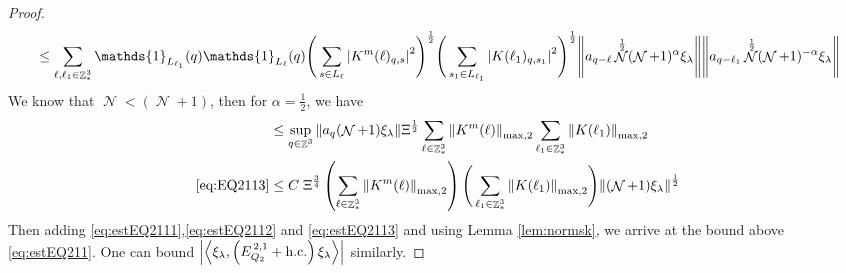 \documentclass[12pt,a4paper]{article}
\numberwithin{equation}{section}
\newcommand{\1}{\mathbb{I}}
\DeclareMathOperator{\Z}{\mathbb{Z}}
\DeclareMathOperator{\NN}{\mathcal{N}}
\newcommand{\half}{\frac{1}{2}}
\newcommand{\eva}[1]{\left\langle #1 \right\rangle}
\theoremstyle{plain}
\theoremstyle{definition}
\theoremstyle{remark}
\theoremstyle{plain}
\theoremstyle{definition}
\theoremstyle{remark}
\begin{document}
\begin{proof}
\begin{align}
	&\leq\sum\limits_{\ell, \ell_1\in \Z^3_*} \mathds{1}_{L_{\ell_1}}(q) \mathds{1}_{L_{\ell}}(q) \Bigg(\sum\limits_{s \in L_{\ell}} \abs{K^m(\ell)_{q,s}}^2\Bigg)^\half \Bigg(\sum\limits_{s_1 \in L_{\ell_1}} \abs{K(\ell_1)_{q,s_1}}^2\Bigg)^\half \norm{ a_{q-\ell} \NN^\half (\NN+1)^{\alpha}\xi_\lambda} \norm{ a_{q-\ell_1} \NN^\half (\NN+1)^{-\alpha} \xi_\lambda }\nonumber\\
\end{align}
We know that $\NN<(\NN+1)$, then for $\alpha = \half$, we have
\begin{align}
	&\leq \sup_{q \in \Z^3}\norm{ a_{q} (\NN+1)\xi_\lambda} \Xi^\half\sum\limits_{\ell \in \Z^3_*} \norm{  K^{m}(\ell)}_{\mathrm{max,2}}  \sum\limits_{\ell_1 \in \Z^3_*} \norm{K(\ell_1)}_{\mathrm{max,2}} \nonumber\\
	\eqref{eq:EQ2113}&\leq C\;\Xi^{\frac{3}{4}} \left(\sum\limits_{\ell \in \Z^3_*} \norm{K^m(\ell)}_{\mathrm{max,2}}\right) \Bigg(\sum\limits_{\ell_1 \in \Z^3_*} \norm{K(\ell_1)}_{\mathrm{max,2}} \Bigg)  \norm{ (\NN+1)\xi_\lambda}^\half \label{eq:estEQ2113}
\end{align}
  Then adding \eqref{eq:estEQ2111},\eqref{eq:estEQ2112} and \eqref{eq:estEQ2113} and using Lemma \ref{lem:normsk}, we arrive at the bound above \eqref{eq:estEQ211}. One can bound $\abs{\eva{\xi_\lambda,\left(E^{\,2,1}_{Q_2}+\mathrm{h.c.}\right) \xi_\lambda }}$ similarly.
\end{proof}
\end{document}
